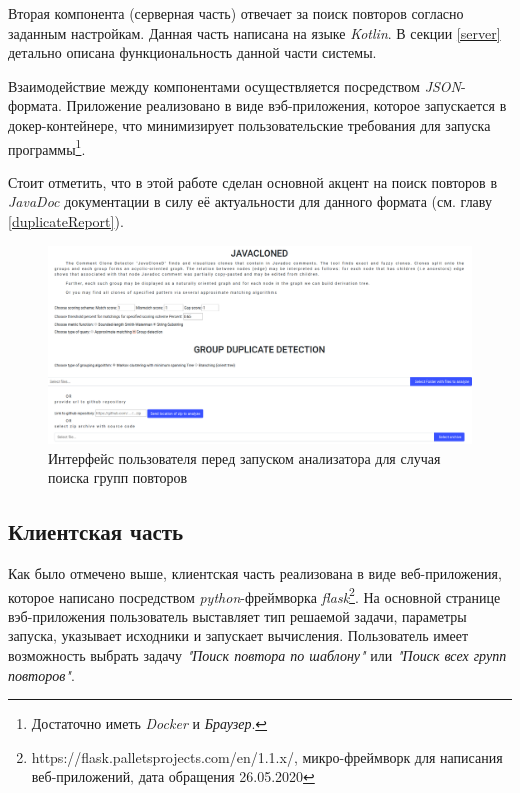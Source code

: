 Вторая компонента (серверная часть) отвечает за поиск повторов согласно заданным настройкам.
Данная часть написана на языке \emph{Kotlin}.
В секции \ref{server} детально описана функциональность данной части системы.

Взаимодействие между компонентами осуществляется посредством \emph{JSON}-формата.
Приложение реализовано в виде вэб-приложения, которое запускается в докер-контейнере, что минимизирует пользовательские требования для запуска программы\footnote{Достаточно иметь \emph{Docker} и \emph{Браузер}.}.




Стоит отметить, что в этой работе сделан основной акцент на поиск повторов в \emph{JavaDoc} документации в силу её актуальности для данного формата (см. главу \ref{duplicateReport}).

\begin{figure}[H]
    \includegraphics[width=\columnwidth]{figures/startApp.png}
    \caption{Интерфейс пользователя перед запуском анализатора для случая поиска групп повторов}\label{fig:startApp}
\end{figure}

\subsection{Клиентская часть}\label{clinet}
Как было отмечено выше, клиентская часть реализована в виде веб-приложения, которое написано посредством \emph{python}-фреймворка \emph{flask}\footnote{https://flask.palletsprojects.com/en/1.1.x/, микро-фреймворк для написания веб-приложений, дата обращения 26.05.2020}.
На основной странице вэб-приложения пользователь выставляет тип решаемой задачи, параметры запуска, указывает исходники и запускает вычисления.
Пользователь имеет возможность выбрать задачу \emph{"Поиск повтора по шаблону"} или \emph{"Поиск всех групп повторов"}.

